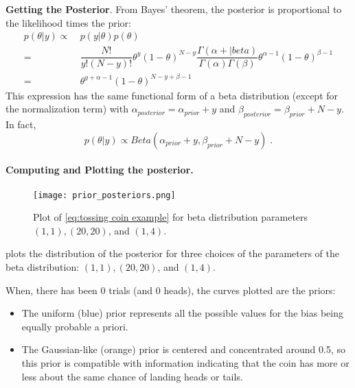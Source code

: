 \begin{example}
    \textbf{Getting the Posterior}. From  Bayes' theorem, the posterior is proportional to the likelihood times the prior:
    \begin{equation}\label{eq:tossing coin example}
        \begin{aligned}
            p(\theta|y)\propto&\ p(y|\theta)p(\theta)\\
                       =&\ \dfrac{N!}{y!(N-y)!}\theta^y(1-\theta)^{N-y}\dfrac{\Gamma(\alpha+|beta)}{\Gamma(\alpha)\Gamma(\beta)}\theta^{\alpha-1}(1-\theta)^{\beta-1}\\
                       =&\ \theta^{y+\alpha-1}(1-\theta)^{N-y+\beta-1}
        \end{aligned}
    \end{equation}
    This expression has the same functional form of a beta distribution (except for the normalization term) with $\alpha_{posterior}=\alpha_{prior}+y$ and $\beta_{posterior}=\beta_{prior}+N-y$. In fact,
    \[p(\theta|y)\propto Beta(\alpha_{prior}+y, \beta_{prior}+N-y)\;.\]

    \paragraph{Computing and Plotting the posterior.} 

    \begin{figure*}
        \texttt{[image: prior\_posteriors.png]}
        \caption{Plot of \cref{eq:tossing coin example} for beta distribution parameters $(1, 1), (20, 20)$, and $(1, 4)$.}
        \label{fig:plot of posterior distributions}
    \end{figure*}

     plots the distribution of the posterior for three choices of the parameters of the beta distribution: $(1, 1), (20, 20)$, and $(1, 4)$.

    When, there has been 0 trials (and 0 heads), the curves plotted are the priors:
    \begin{itemize}
        \item The uniform (blue) prior represents all the possible values for the bias being equally probable a priori.
        
        \item The Gaussian-like (orange) prior is centered and concentrated around 0.5, so this prior is compatible with information indicating that the coin has more or less about the same chance of landing heads or tails.
        

\end{itemize}
\end{example}
